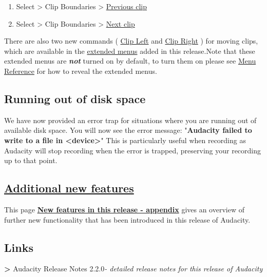 \begin{multicols}{2}
\begin{enumerate}
\item Select > Clip Boundaries > 
\hyperref[\foo{select:menu:clip:boundaries:previous:clip}]{Previous clip}

\item Select > Clip Boundaries > 
\hyperref[\foo{select:menu:clip:boundaries:next:clip}]{Next clip}

\end{enumerate}
There are also two new commands (
\hyperref[\foo{ext:command:menu:cursor:clip:left}]{Clip Left}
 and 
\hyperref[\foo{ext:command:menu:cursor:clip:right}]{Clip Right}
) for moving clips, which are available in the 
\hyperref[\foo{new:features:in:this:release::extendedmenubar}]{extended menus}
 added in this release.Note that these extended menus are \textit{\textbf{not}} turned on by default, to turn them on please see 
\hyperref[\foo{menu:reference:the:extended:menu:bar}]{Menu Reference}
 for how to reveal the extended menus.
\subsection{Running out of disk space}
\label{new:features:in:this:release:safety}We have now provided an error trap for situations where you are running out of available disk space.
You will now see the error message:
"\textbf{Audacity failed to write to a file in <device>}"
This is particularly useful when recording as Audacity will stop recording when the error is trapped, preserving your recording up to that point.

\subsection{
\hyperref[\foo{new:features:in:this:release:appendix:}]{Additional new features}
}
\label{new:features:in:this:release:appendix}This page \textbf{
\hyperref[\foo{new:features:in:this:release:appendix:}]{New features in this release - appendix}
} gives an overview of further new functionality that has been introduced in this release of Audacity.

\subsection{Links}\textbf{>} Audacity Release Notes 2.2.0\textit{- detailed release notes for this release of Audacity}\end{multicols}